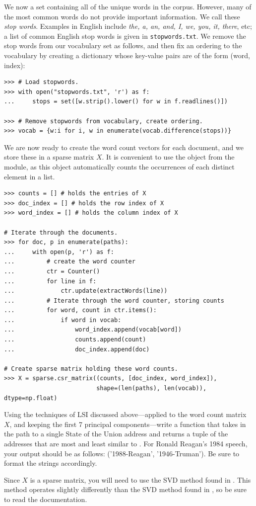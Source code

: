 We now  a set containing all of the unique words in the corpus. However, many of the most common words do not provide important information.
We call these \emph{stop words}. Examples in English include \emph{the, a, an, and, I, we, you, it, there}, etc;
a list of common English stop words is given in \texttt{stopwords.txt}.
We remove the stop words from our vocabulary set as follows, and then fix an ordering to the vocabulary by creating a dictionary
whose key-value pairs are of the form (word, index):
\begin{lstlisting}
>>> # Load stopwords.
>>> with open("stopwords.txt", 'r') as f:
...     stops = set([w.strip().lower() for w in f.readlines()])

>>> # Remove stopwords from vocabulary, create ordering.
>>> vocab = {w:i for i, w in enumerate(vocab.difference(stops))}
\end{lstlisting}

We are now ready to create the word count vectors for each document, and we store these in a sparse matrix $X$.
It is convenient to use the  object from the  module, as this
object automatically counts the occurrences of each distinct element in a list.
\begin{lstlisting}
>>> counts = [] # holds the entries of X
>>> doc_index = [] # holds the row index of X
>>> word_index = [] # holds the column index of X

# Iterate through the documents.
>>> for doc, p in enumerate(paths):
...     with open(p, 'r') as f:
...         # create the word counter
...         ctr = Counter()
...         for line in f:
...             ctr.update(extractWords(line))
...         # Iterate through the word counter, storing counts
...         for word, count in ctr.items():
...             if word in vocab:
...                 word_index.append(vocab[word])
...                 counts.append(count)
...                 doc_index.append(doc)

# Create sparse matrix holding these word counts.
>>> X = sparse.csr_matrix((counts, [doc_index, word_index]),
                          shape=(len(paths), len(vocab)), dtype=np.float)
\end{lstlisting}

\begin{problem}
Using the techniques of LSI discussed above---applied to the word count matrix $X$, and keeping the first 7 principal components---write a function that takes in the path to a single State of the Union address  and returns a tuple of the addresses that are most and least similar to .
For Ronald Reagan's 1984 speech, your output should be as follows: ('1988-Reagan', '1946-Truman'). Be sure to format the strings accordingly. 

Since $X$ is a sparse matrix, you will need to use the SVD method found in .
This method operates slightly differently than the SVD method found in , so be sure to read the documentation.
\label{prob:LSI1}
\end{problem}

